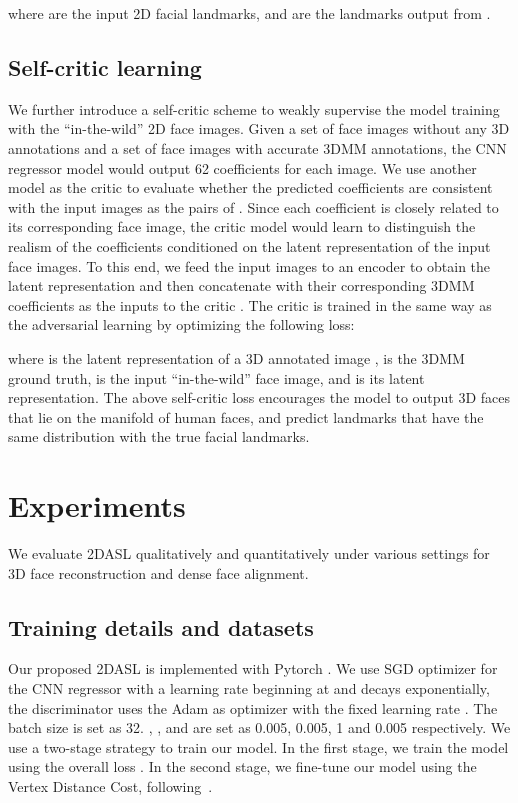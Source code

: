 \documentclass[10pt,twocolumn,letterpaper]{article}
\begin{document}
{where  are the input 2D facial landmarks, and  are the landmarks output from .

\subsection{Self-critic learning}
We further introduce a self-critic scheme to weakly supervise the model training with the ``in-the-wild'' 2D face images. Given a set of face images  without any 3D annotations and a set of face images  with accurate 3DMM annotations, the CNN regressor model  would output 62 coefficients for each image.  We use another model as the critic   to evaluate    whether the predicted coefficients are consistent with the input images as the pairs of  . Since each coefficient is closely related to its corresponding face image, the critic model would learn to distinguish the realism of the coefficients conditioned on the latent representation of the input face images. To this end, we feed the input images to an encoder to obtain the latent representation  and then concatenate with their corresponding 3DMM coefficients as the inputs to the critic . The critic is trained in the same way as the {adversarial learning} by optimizing the following loss:

where  is the latent representation of a 3D annotated image ,  is the 3DMM ground truth,  is the input ``in-the-wild'' face image, and  is its latent representation. The above self-critic loss encourages the model to output 3D faces that lie on the manifold of human faces, and predict landmarks that have the same distribution with the true facial landmarks.

\section{Experiments}
We evaluate 2DASL qualitatively and quantitatively under various settings for 3D face reconstruction and dense face alignment.
\subsection{Training details and datasets}
Our proposed 2DASL is implemented with Pytorch \cite{paszke2017pytorch}. We use SGD optimizer for the CNN regressor with a learning rate beginning at  and decays exponentially, the discriminator uses the Adam as optimizer with the fixed learning rate  . The batch size is set as 32. , ,  and    are set as 0.005, 0.005, 1 and 0.005 respectively.   We use a two-stage strategy to train our model. In the first stage, we train the model using the overall loss . In the second stage, we fine-tune our model using the Vertex Distance Cost, following~\cite{zhu2016face}.

}
\end{document}
